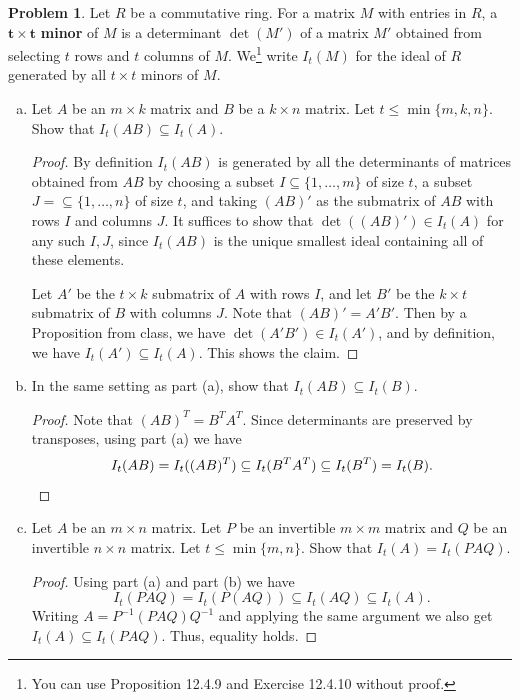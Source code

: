 \documentclass[11pt]{article}
\theoremstyle{definition}
\newtheorem{problem}{Problem}
\begin{document}
\begin{problem} Let $R$ be a commutative ring. For a matrix $M$ with entries in $R$, a $\boldsymbol{t\times t}$ \textbf{minor} of $M$ is a determinant $\det(M')$ of a matrix $M'$ obtained from selecting $t$ rows and $t$ columns of $M$.
We\footnote{You can use Proposition 12.4.9 and Exercise 12.4.10 without proof.} write $I_t(M)$ for the ideal of $R$ generated by all $t\times t$ minors of $M$.
\begin{enumerate}[(a)]
\item Let $A$ be an $m\times k$ matrix and $B$ be a $k\times n$ matrix. Let $t\leq \min\{m,k,n\}$. Show that $I_t(AB) \subseteq I_t(A)$.
\begin{proof}
By definition $I_t(AB)$ is generated by all the determinants of matrices obtained from $AB$ by choosing a subset $I \subseteq\{1,\dots,m\}$ of size $t$, a subset $J=\subseteq \{1,\dots, n\}$ of size $t$, and taking $(AB)'$ as the submatrix of $AB$ with rows $I$ and columns $J$. It suffices to show that $\det((AB)')\in I_t(A)$ for any such $I,J$, since $I_t(AB)$ is the unique smallest ideal containing all of these elements.

Let $A'$ be the $t\times k$ submatrix of $A$ with rows $I$, and let $B'$ be the $k\times t$ submatrix of $B$ with columns $J$. Note that $(AB)' = A' B'$. Then by a Proposition from class, we have $\det(A'B')\in I_t(A')$, and by definition, we have $I_t(A')\subseteq I_t(A)$. This shows the claim.
\end{proof}

\item In the same setting as part (a), show that $I_t(AB) \subseteq I_t(B)$.
\begin{proof} 
Note that $(AB)^T = B^T A^T$. Since determinants are preserved by transposes, using part (a) we have \[I_t(AB) = I_t((AB)^T) \subseteq I_t(B^T A^T) \subseteq I_t(B^T) =I_t(B).\qedhere\]
\end{proof}
\item Let $A$ be an $m\times n$ matrix. Let $P$ be an invertible $m\times m$ matrix and $Q$ be an invertible $n\times n$ matrix. Let $t\leq \min\{m,n\}$. Show that $I_t(A) = I_t(PAQ)$.
\begin{proof} Using part (a) and part (b) we have
\[ I_t(PAQ) = I_t(P(AQ)) \subseteq I_t(AQ) \subseteq I_t(A).\]
Writing $A = P^{-1} (PAQ) Q^{-1}$ and applying the same argument we also get $I_t(A) \subseteq I_t(PAQ)$. Thus, equality holds.
\end{proof}
\end{enumerate}
\end{problem}
\end{document}

